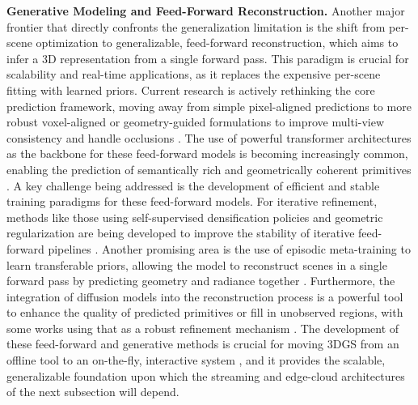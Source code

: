 \documentclass[11pt]{article}
\begin{document}
\textbf{Generative Modeling and Feed-Forward Reconstruction.} Another major frontier that directly confronts the generalization limitation is the shift from per-scene optimization to generalizable, feed-forward reconstruction, which aims to infer a 3D representation from a single forward pass. This paradigm is crucial for scalability and real-time applications, as it replaces the expensive per-scene fitting with learned priors. Current research is actively rethinking the core prediction framework, moving away from simple pixel-aligned predictions to more robust voxel-aligned or geometry-guided formulations to improve multi-view consistency and handle occlusions \cite{ref767,ref768}. The use of powerful transformer architectures as the backbone for these feed-forward models is becoming increasingly common, enabling the prediction of semantically rich and geometrically coherent primitives \cite{ref769,ref672}. A key challenge being addressed is the development of efficient and stable training paradigms for these feed-forward models. For iterative refinement, methods like those using self-supervised densification policies and geometric regularization are being developed to improve the stability of iterative feed-forward pipelines \cite{ref236}. Another promising area is the use of episodic meta-training to learn transferable priors, allowing the model to reconstruct scenes in a single forward pass by predicting geometry and radiance together \cite{ref700}. Furthermore, the integration of diffusion models into the reconstruction process is a powerful tool to enhance the quality of predicted primitives or fill in unobserved regions, with some works using that as a robust refinement mechanism \cite{ref770,ref771}. The development of these feed-forward and generative methods is crucial for moving 3DGS from an offline tool to an on-the-fly, interactive system \cite{ref772}, and it provides the scalable, generalizable foundation upon which the streaming and edge-cloud architectures of the next subsection will depend.
\end{document}
